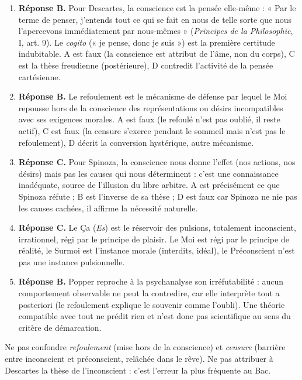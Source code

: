 \documentclass[11pt]{article}
\begin{document}
\begin{corrige}
\begin{enumerate}
\item \textbf{Réponse B.} Pour Descartes, la conscience est la pensée elle-même : « Par le terme de penser, j'entends tout ce qui se fait en nous de telle sorte que nous l'apercevons immédiatement par nous-mêmes » (\emph{Principes de la Philosophie}, I, art. 9). Le \emph{cogito} (« je pense, donc je suis ») est la première certitude indubitable. A est faux (la conscience est attribut de l'âme, non du corps), C est la thèse freudienne (postérieure), D contredit l'activité de la pensée cartésienne.
\item \textbf{Réponse B.} Le refoulement est le mécanisme de défense par lequel le Moi repousse hors de la conscience des représentations ou désirs incompatibles avec ses exigences morales. A est faux (le refoulé n'est pas oublié, il reste actif), C est faux (la censure s'exerce pendant le sommeil mais n'est pas le refoulement), D décrit la conversion hystérique, autre mécanisme.
\item \textbf{Réponse C.} Pour Spinoza, la conscience nous donne l'effet (nos actions, nos désirs) mais pas les causes qui nous déterminent : c'est une connaissance inadéquate, source de l'illusion du libre arbitre. A est précisément ce que Spinoza réfute ; B est l'inverse de sa thèse ; D est faux car Spinoza ne nie pas les causes cachées, il affirme la nécessité naturelle.
\item \textbf{Réponse C.} Le Ça (\emph{Es}) est le réservoir des pulsions, totalement inconscient, irrationnel, régi par le principe de plaisir. Le Moi est régi par le principe de réalité, le Surmoi est l'instance morale (interdits, idéal), le Préconscient n'est pas une instance pulsionnelle.
\item \textbf{Réponse B.} Popper reproche à la psychanalyse son irréfutabilité : aucun comportement observable ne peut la contredire, car elle interprète tout a posteriori (le refoulement explique le souvenir comme l'oubli). Une théorie compatible avec tout ne prédit rien et n'est donc pas scientifique au sens du critère de démarcation.
\end{enumerate}
\end{corrige}

\begin{attention}
Ne pas confondre \emph{refoulement} (mise hors de la conscience) et \emph{censure} (barrière entre inconscient et préconscient, relâchée dans le rêve). Ne pas attribuer à Descartes la thèse de l'inconscient : c'est l'erreur la plus fréquente au Bac.
\end{attention}
\end{document}
